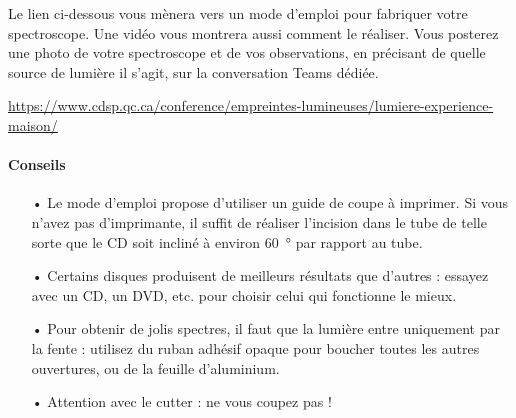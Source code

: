 \documentclass[12pt,a4paper]{article}
\begin{document}
Le lien ci-dessous vous mènera vers un mode d'emploi pour fabriquer votre spectroscope.
Une vidéo vous montrera aussi comment le réaliser.
Vous posterez une photo de votre spectroscope et de vos observations, en précisant de quelle source de lumière il s'agit, sur la conversation Teams dédiée.

\begin{center}
\href{https://www.cdsp.qc.ca/conference/empreintes-lumineuses/lumiere-experience-maison/}{https://www.cdsp.qc.ca/conference/empreintes-lumineuses/lumiere-experience-maison/}
\end{center}

\paragraph*{Conseils}
\begin{itemize}
	\item[•] Le mode d'emploi propose d'utiliser un guide de coupe à imprimer.
	Si vous n'avez pas d'imprimante, il suffit de réaliser l'incision dans le tube de telle sorte que le CD soit incliné à environ \SI{60}{\degree} par rapport au tube.
	\item[•] Certains disques produisent de meilleurs résultats que d'autres : essayez avec un CD, un DVD, etc. pour choisir celui qui fonctionne le mieux.
	\item[•] Pour obtenir de jolis spectres, il faut que la lumière entre uniquement par la fente : utilisez du ruban adhésif opaque pour boucher toutes les autres ouvertures, ou de la feuille d'aluminium.
	\item[•] Attention avec le cutter : ne vous coupez pas !
\end{itemize}
\end{document}

